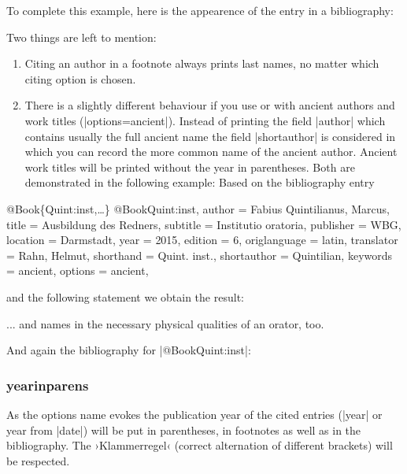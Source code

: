 \documentclass[a4paper,
10pt,
greek,
french,
spanish,
italian,
ngerman,
english
]{ltxdoc}
\begin{document}
To complete this example,
here is the appearence of the entry in a bibliography:


Two things are left to mention: 
\begin{enumerate}
\item Citing an author in a footnote always prints  last names, no matter which citing option is chosen. 
\item There is a slightly different behaviour if you use   or   with ancient authors and work titles (|options={ancient}|).
Instead of printing the field |author| which contains usually the full ancient name the field |shortauthor| is considered in which you can record the more common name of the ancient author.
Ancient work titles will be printed without the year in parentheses. 
Both are demonstrated in the following example: Based on the bibliography entry
\end{enumerate}
\begin{bibexample}[label=Quint:inst]{{@}Book\{Quint:inst,…\}}
@Book{Quint:inst,
  author       = {Fabius Quintilianus, Marcus},
  title        = {Ausbildung des Redners},
  subtitle     = {Institutio oratoria},
  publisher    = WBG,
  location     = {Darmstadt},
  year         = {2015},
  edition      = {6},
  origlanguage = {latin},
  translator   = {Rahn, Helmut},
  shorthand    = {Quint. inst.},
  shortauthor  = {Quintilian},
  keywords     = {ancient},
  options      = {ancient},
}
\end{bibexample}

and the following statement we obtain the result:

\begin{refsection}
\begin{example}
... and \citeauthor{Quint:inst} names in  the  necessary physical qualities of an orator, too.
\end{example}
\end{refsection}

And again the bibliography for |@Book{Quint:inst}|:

\subsubsection{yearinparens}\label{yearinparens}
%
As the options name evokes the publication year of the cited entries 
(|year| or year from |date|) will be put in parentheses,
in footnotes as well as in the bibliography. 
The ›Klammerregel‹ (correct alternation of different brackets) will be respected.
\end{document}
